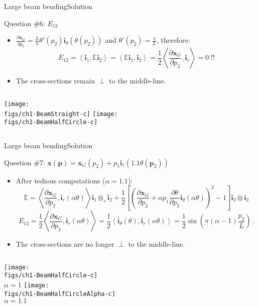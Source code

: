 \documentclass{beamer}
\newcommand{\demi}{\frac{1}{2}}
\newcommand{\xj}{x}
\newcommand{\xv}{{\boldsymbol\xj}}
\renewcommand{\ij}{i}
\newcommand{\pj}{p}
\newcommand{\iv}{{\boldsymbol\ij}}
\newcommand{\pv}{{\boldsymbol\pj}}
\newcommand{\GreenLj}{E}
\newcommand{\GreenL}{{\mathbb\GreenLj}}
\newcommand{\scal}[1]{\left\langle{#1}\right\rangle}
\begin{document}
\begin{frame}{Large beam bending}{Solution}

\begin{exampleblock}{Question \#6: $\GreenLj_{12}$}
\begin{itemize}
\item $\frac{\partial\xv_G}{\partial\pj_2}=\frac{L}{\pi}\theta'(\pj_2)\iv_\theta(\theta(\pj_2))$ and $\theta'(\pj_2)=\frac{\pi}{L}$, therefore:
\begin{displaymath}
\GreenLj_{12}=\scal{\iv_1,\GreenL\iv_2}=\scal{\GreenL\iv_1,\iv_2}=\demi\scal{\frac{\partial\xv_G}{\partial\pj_2},\iv_r}=0\;\text{!!}
\end{displaymath}
\item The cross-sections remain $\perp$ to the middle-line.
\end{itemize}
\begin{columns}
\centering\texttt{[image: \\figs/ch1-BeamStraight-c]}
\centering\texttt{[image: \\figs/ch1-BeamHalfCircle-c]}
\end{columns}
\end{exampleblock}

\end{frame}

\begin{frame}{Large beam bending}{Solution}

\begin{exampleblock}{Question \#7: $\xv(\pv)=\xv_G(\pj_2)+\pj_1\iv_r(1.1\theta(\pv_2))$}
\begin{itemize}
\item After tedious computations ($\alpha=1.1$):
{\scriptsize
\begin{displaymath}
\GreenL=\scal{\frac{\partial\xv_G}{\partial\pj_2},\iv_r(\alpha\theta)}\iv_1\otimes_s\iv_2+\demi\left[\left(\frac{\partial\xv_G}{\partial\pj_2}+\alpha\pj_1\frac{\partial\theta}{\partial\pj_2}\iv_\theta(\alpha\theta)\right)^2-1\right]\iv_2\otimes\iv_2
\end{displaymath}
\begin{displaymath}
\GreenLj_{12}=\demi\scal{\frac{\partial\xv_G}{\partial\pj_2},\iv_r(\alpha\theta)}=\demi\scal{\iv_\theta(\theta),\iv_r(\alpha\theta)}=\demi\sin\left(\pi(\alpha-1)\frac{\pj_2}{L}\right)\,.
\end{displaymath}}
\item The cross-sections are no longer $\perp$ to the middle-line.
\end{itemize}
\begin{columns}
\centering\texttt{[image: \\figs/ch1-BeamHalfCircle-c]}\\
$\alpha=1$
\centering\texttt{[image: \\figs/ch1-BeamHalfCircleAlpha-c]}\\
$\alpha=1.1$
\end{columns}
\end{exampleblock}

\end{frame}
\end{document}

